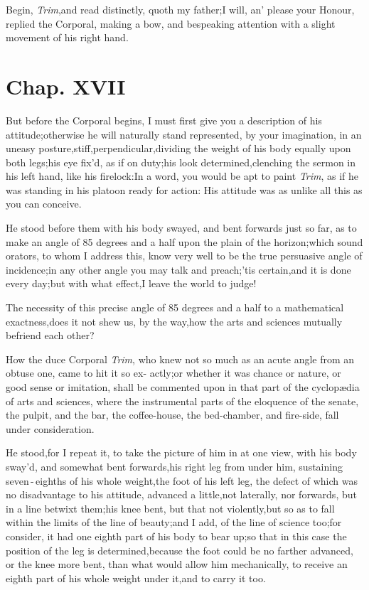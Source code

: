 \documentclass{article}
\begin{document}
Begin, \textit{Trim},\tsh and read distinctly, quoth my
father;\tsk I will, an’ please your\pb
Honour, replied the
Corporal, making a bow, and bespeaking attention with a slight
movement of his right hand.

\section{Chap. XVII}

\quad\tsh But before the Corporal
begins, I must first give you a description of his
attitude;\tsh otherwise he will naturally stand
represented, by your imagination, in an uneasy
posture,\tsk stiff,\tsk perpendi\-cular,\tsk dividing the
weight of his body equally upon both legs;\tsh his eye fix’d,
as if on duty;\tsk his look determined,\tsk\break clenching the
sermon in his left hand, like his firelock:\tsk In a word,
you would be apt to paint \textit{Trim}, as if he was standing in his
platoon ready for action:\tsh\break
His attitude was as unlike all this as you\break
can conceive.

\newpage
He stood before them with his body swayed, and bent forwards
just so far, as to make an angle of 85 degrees and a half upon the
plain of the horizon;\tsh\break which sound orators, to whom I address
this, know very well to be the true persuasive angle of
incidence;\tsk in any other angle you may talk and
preach;\tsk ’tis certain,\tsk and it is done every
day;\tsk\break but with what effect,\tsk I leave the world to
judge!

The necessity of this precise angle of 85 degrees and a half to
a mathematical exactness,\tsh does it not shew us, by the
way,\tsk how the arts and sciences mutually befriend each other?

How the duce Corporal \textit{Trim}, who\break
knew not so much as an acute angle\break
from an obtuse one, came to hit it so ex-\pb 
actly;\tsh or whether it was chance or nature, or good
sense or imitation, \etc\break shall be commented upon in that part of
the cyclopædia of arts and sciences, where the instrumental
parts of the eloquence of the senate, the pulpit, and the bar, the
coffee-house, the bed-chamber, and fire-side, fall under
consideration.

He stood,\tsh for I repeat it, to take the picture of
him in at one view, with his body sway’d, and somewhat bent
forwards,\tsk his right leg from under him, sustaining
seven\,-\,eighths of his whole\break
weight,\tsk the foot of his
left leg, the defect of which was no disadvantage to his attitude,
advanced a little,\tsk not laterally, nor forwards, but in a line
betwixt them;\tsk his knee bent, but that not
violently,\tsk but so as to fall within the limits of the line of
beauty;\tsk and I add,\pb
of the line of science too;\tsk for
consider, it had one eighth part of his body to bear up;\tsk so
that in this case the position of the leg is
determined,\tsk because the foot could be no farther advanced, or
the knee more bent, than what would allow him mechanically,
to receive an eighth part of his whole weight under\break
it,\tsk and to carry it too.
\end{document}
